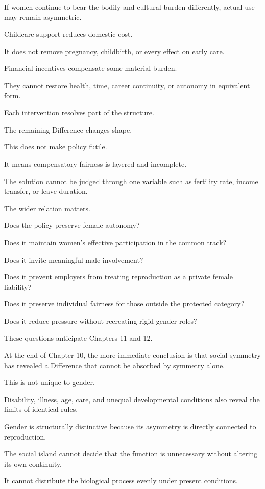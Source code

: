 If women continue to bear the bodily and cultural burden differently, actual use may remain asymmetric.

Childcare support reduces domestic cost.

It does not remove pregnancy, childbirth, or every effect on early care.

Financial incentives compensate some material burden.

They cannot restore health, time, career continuity, or autonomy in equivalent form.

Each intervention resolves part of the structure.

The remaining Difference changes shape.

This does not make policy futile.

It means compensatory fairness is layered and incomplete.

The solution cannot be judged through one variable such as fertility rate, income transfer, or leave duration.

The wider relation matters.

Does the policy preserve female autonomy?

Does it maintain women’s effective participation in the common track?

Does it invite meaningful male involvement?

Does it prevent employers from treating reproduction as a private female liability?

Does it preserve individual fairness for those outside the protected category?

Does it reduce pressure without recreating rigid gender roles?

These questions anticipate Chapters 11 and 12.

At the end of Chapter 10, the more immediate conclusion is that social symmetry has revealed a Difference that cannot be absorbed by symmetry alone.

This is not unique to gender.

Disability, illness, age, care, and unequal developmental conditions also reveal the limits of identical rules.

Gender is structurally distinctive because its asymmetry is directly connected to reproduction.

The social island cannot decide that the function is unnecessary without altering its own continuity.

It cannot distribute the biological process evenly under present conditions.

